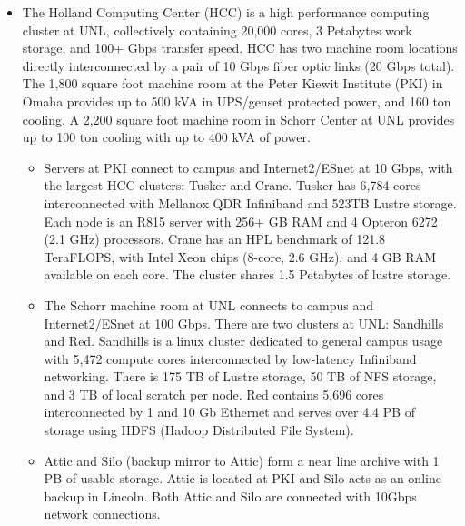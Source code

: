 \documentclass[12pt,letterpaper]{article}
\begin{document}
\begin{itemize}
	\item The Holland Computing Center (HCC) is a high performance computing
	cluster at UNL, collectively containing 20,000 cores, 3 Petabytes work
	storage, and 100+ Gbps transfer speed. HCC has two machine room locations
	directly interconnected by a pair of 10 Gbps fiber optic links (20 Gbps
	total). The 1,800 square foot machine room at the Peter Kiewit Institute
	(PKI) in Omaha provides up to 500 kVA in UPS/genset protected power, and 160
	ton cooling. A 2,200 square foot machine room in Schorr Center at UNL
	provides up to 100 ton cooling with up to 400 kVA of power.
	\begin{itemize}
		\item Servers at PKI connect to campus and Internet2/ESnet at 10 Gbps, with the largest HCC clusters: Tusker and Crane. Tusker has 6,784 cores interconnected with Mellanox QDR Infiniband and 523TB Lustre storage. Each node is an R815 server with 256+ GB RAM and 4 Opteron 6272 (2.1 GHz) processors. Crane has an HPL benchmark of 121.8 TeraFLOPS, with Intel Xeon chips (8-core, 2.6 GHz), and 4 GB RAM available on each core. The cluster shares 1.5 Petabytes of lustre storage.
		\item The Schorr machine room at UNL connects to campus and Internet2/ESnet at 100 Gbps. There are two clusters at UNL: Sandhills and Red. Sandhills is a linux cluster dedicated to general campus usage with 5,472 compute cores interconnected by low-latency Infiniband networking. There is 175 TB of Lustre storage, 50 TB of NFS storage, and 3 TB of local scratch per node. Red contains 5,696 cores interconnected by 1 and 10 Gb Ethernet and serves over 4.4 PB of storage using HDFS (Hadoop Distributed File System).
		\item Attic and Silo (backup mirror to Attic) form a near line archive with 1 PB of usable storage. Attic is located at PKI and Silo acts as an online backup in Lincoln. Both Attic and Silo are connected with 10Gbps network connections.
	\end{itemize}
\end{itemize}
\end{document}
